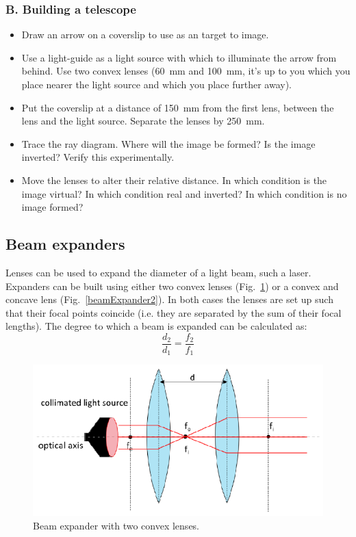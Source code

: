 \documentclass[a4paper]{report}
\begin{document}
\subsubsection{B. Building a telescope}
\begin{itemize}
\item Draw an arrow on a coverslip to use as an target to image. 
\item Use a light-guide as a light source with which to illuminate the arrow from behind. 
Use two convex lenses (60~mm and 100~mm, it's up to you which you place nearer the light source and which you place further away). 
\item Put the coverslip at a distance of 150~mm from the first lens, between the lens and the light source. 
Separate the lenses by 250~mm. 
\item Trace the ray diagram. Where will the image be formed? Is the image inverted?  Verify this experimentally. 
\item Move the lenses to alter their relative distance. In which condition is the image virtual? In
which condition real and inverted? In which condition is no image formed?
\end{itemize}


\subsection{Beam expanders}
Lenses can be used to expand the diameter of a light beam, such a laser.
Expanders can be built using either two convex lenses (Fig.~\ref{beamExpander1}) or a convex and concave lens (Fig.~\ref{beamExpander2}). 
In both cases the lenses are set up such that their focal points coincide (i.e. they are separated by the sum of their focal lengths). 
The degree to which a beam is expanded can be calculated as:
\begin{equation}
\frac{d_2}{d_1}=\frac{f_2}{f_1}
\label{eq:beamExp}
\end{equation}

\begin{figure}[h]
\center
\includegraphics[width=4.5in]{beamExpander1.eps}
\caption{Beam expander with two convex lenses.}
\label{beamExpander1}
\end{figure}
\end{document}

